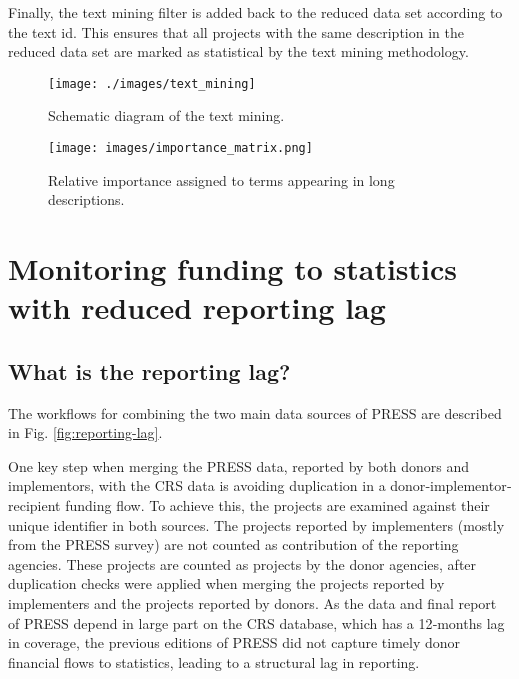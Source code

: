 \documentclass[
]{article}
\begin{document}
Finally, the text mining filter is added back to the reduced data set according to the text id. This ensures that all projects with the same description in the reduced data set are marked as statistical by the text mining methodology.

\begin{figure}

{\centering \texttt{[image: ./images/text\_mining]} 

}

\caption{Schematic diagram of the text mining.}\label{fig:text-mining}
\end{figure}

\begin{figure}[H]
    \centering
    \texttt{[image: images/importance\_matrix.png]}
    \caption{Relative importance assigned to terms appearing in long descriptions.}
    \label{fig:importance-matrix}
  \end{figure}

\hypertarget{monitoring-funding-to-statistics-with-reduced-reporting-lag}{%
\section{Monitoring funding to statistics with reduced reporting lag}\label{monitoring-funding-to-statistics-with-reduced-reporting-lag}}

\hypertarget{what-is-the-reporting-lag}{%
\subsection{What is the reporting lag?}\label{what-is-the-reporting-lag}}

The workflows for combining the two main data sources of PRESS are described in Fig. \ref{fig:reporting-lag}.

One key step when merging the PRESS data, reported by both donors and implementors, with the CRS
data is avoiding duplication in a donor‐implementor‐recipient funding flow. To achieve this, the
projects are examined against their unique identifier in both sources. The projects reported by
implementers (mostly from the PRESS survey) are not counted as contribution of the reporting
agencies. These projects are counted as projects by the donor agencies, after duplication checks were
applied when merging the projects reported by implementers and the projects reported by donors.
As the data and final report of PRESS depend in large part on the CRS database, which has a 12‐months
lag in coverage, the previous editions of PRESS did not capture timely donor financial flows to
statistics, leading to a structural lag in reporting.
\end{document}
